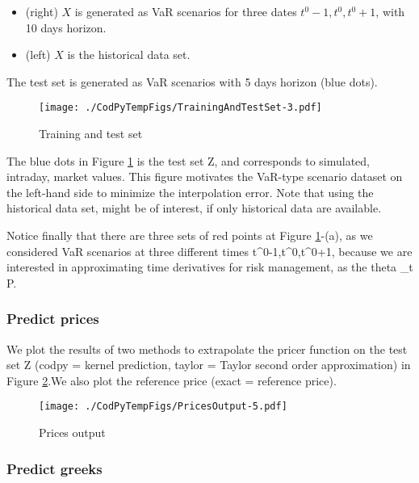 \documentclass[
]{article}
\def\({}%
\def\){}%
\numberwithin{equation}{section}
\begin{document}
\begin{itemize}
\item (right) $X$ is generated as VaR scenarios for three dates $t^0-1,t^0,t^0+1$, with 10 days horizon.
\item (left) $X$ is the historical data set.
\end{itemize}

The test set is generated as VaR scenarios with 5 days horizon (blue
dots).

\begin{figure}
\centering
\texttt{[image: ./CodPyTempFigs/TrainingAndTestSet-3.pdf]}
\caption{\label{plot10} Training and test set}
\end{figure}

The blue dots in Figure \ref{plot10} is the test set \(Z\), and
corresponds to simulated, intraday, market values. This figure motivates
the VaR-type scenario dataset on the left-hand side to minimize the
interpolation error. Note that using the historical data set, might be
of interest, if only historical data are available.

Notice finally that there are three sets of red points at Figure
\ref{plot10}-(a), as we considered VaR scenarios at three different
times \(t^0-1,t^0,t^0+1\), because we are interested in approximating
time derivatives for risk management, as the theta \(\partial_t P\).

\newpage

\hypertarget{predict-prices}{%
\subsubsection{Predict prices}\label{predict-prices}}

We plot the results of two methods to extrapolate the pricer function on
the test set \(Z\) (codpy = kernel prediction, taylor = Taylor second
order approximation) in Figure \ref{plot11}.We also plot the reference
price (exact = reference price).

\begin{figure}
\centering
\texttt{[image: ./CodPyTempFigs/PricesOutput-5.pdf]}
\caption{\label{plot11} Prices output}
\end{figure}

\newpage

\hypertarget{predict-greeks}{%
\subsubsection{Predict greeks}\label{predict-greeks}}
\end{document}
